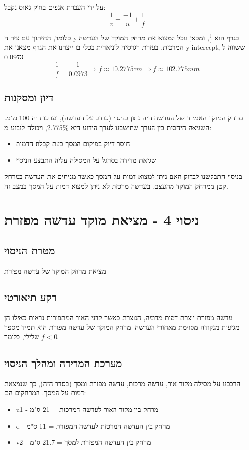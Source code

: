 \documentclass[14pt]{extarticle}
\begin{document}
על ידי העברת אגפים בחוק גאוס נקבל:
\begin{equation}
\frac{1}{v} = \frac{-1}{u} + \frac{1}{f}
\end{equation}

כלומר, החיתוך עם ציר ה-y בגרף הוא $\frac{1}{f}$, ומכאן נוכל למצוא את מרחק המוקד של העדשה המרכזת.
בעזרת רגרסיה ליניארית בכלי  בו ייצרנו  את הגרף מצאנו את y intercept, ששווה ל 0.0973
\begin{equation}
\frac{1}{f} = \frac{1}{0.0973} \Rightarrow f \approx 10.2775 cm \Rightarrow f \approx 102.775 mm
\end{equation}

\subsection*{דיון ומסקנות}
מרחק המוקד האמיתי של העדשה היה נתון בניסוי (כתוב על העדשה), וערכו היה 100 מ"מ.
השגיאה היחסית בין הערך שחישבנו לערך הידוע היא 2.775\%, ויכולה לנבוע מ:
\begin{itemize}
    \item חוסר דיוק במיקום המסך בעת קבלת הדמות
    \item שגיאת מדידה בסרגל על המסילה עליה התבצע הניסוי
\end{itemize}

בניסוי התבקשנו לבדוק האם ניתן למצוא דמות על המסך כאשר מניחים את העדשה במרחק קטן ממרחק המוקד מהעצם.
בעדשה מרכזת לא ניתן למצוא דמות על המסך במצב זה.

\section*{ניסוי 4 - מציאת מוקד עדשה מפזרת}
\subsection*{מטרת הניסוי}
מציאת מרחק המוקד של עדשה מפזרת
\subsection*{רקע תיאורטי}
עדשה מפזרת יוצרת דמות מדומה, הנוצרת כאשר קרני האור המתפזרות נראות כאילו הן מגיעות מנקודה מסוימת מאחורי העדשה. מרחק המוקד של עדשה מפזרת הוא תמיד מספר שלילי, כלומר $f < 0$.

\subsection*{מערכת המדידה ומהלך הניסוי}
הרכבנו על מסילה מקור אור, עדשה מרכזת, עדשה מפזרת ומסך (בסדר הזה), כך שנמצאת דמות על המסך.
המרחקים הם:
\begin{itemize}
    \item u1 - מרחק בין מקור האור לעדשה המרכזת = 21 ס"מ
    \item d - מרחק בין העדשה המרכזת לעדשה המפזרת = 11 ס"מ
    \item v2 - מרחק בין העדשה המפזרת למסך = 21.7 ס"מ
\end{itemize}
\end{document}
